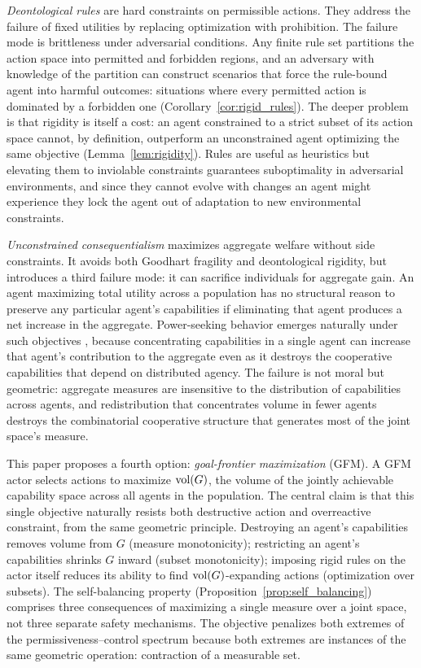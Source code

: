 \emph{Deontological rules} are hard constraints on permissible actions. They
address the failure of fixed utilities by replacing optimization with
prohibition. The failure mode is brittleness under adversarial conditions. Any
finite rule set partitions the action space into permitted and forbidden
regions, and an adversary with knowledge of the partition can construct
scenarios that force the rule-bound agent into harmful outcomes: situations
where every permitted action is dominated by a forbidden one
(Corollary~\ref{cor:rigid_rules}). The deeper problem is that rigidity is
itself a cost: an agent constrained to a strict subset of its action space
cannot, by definition, outperform an unconstrained agent optimizing the same
objective (Lemma~\ref{lem:rigidity}). Rules are useful as heuristics but
elevating them to inviolable constraints guarantees suboptimality in
adversarial environments, and since they cannot evolve with changes an agent
might experience they lock the agent out of adaptation to new environmental
constraints.

\emph{Unconstrained consequentialism} maximizes aggregate welfare without side
constraints. It avoids both Goodhart fragility and deontological rigidity, but
introduces a third failure mode: it can sacrifice individuals for aggregate
gain. An agent maximizing total utility across a population has no structural
reason to preserve any particular agent's capabilities if eliminating that
agent produces a net increase in the aggregate. Power-seeking behavior emerges
naturally under such objectives \citep{carlsmith2022power, turner2021optimal},
because concentrating capabilities in a single agent can increase that agent's
contribution to the aggregate even as it destroys the cooperative capabilities
that depend on distributed agency. The failure is not moral but geometric:
aggregate measures are insensitive to the distribution of capabilities across
agents, and redistribution that concentrates volume in fewer agents destroys
the combinatorial cooperative structure that generates most of the joint
space's measure.

This paper proposes a fourth option: \emph{goal-frontier maximization} (GFM). A
GFM actor selects actions to maximize $\operatorname{vol}(G)$, the volume of the jointly
achievable capability space across all agents in the population. The central
claim is that this single objective naturally resists both destructive action
and overreactive constraint, from the same geometric principle. Destroying an
agent's capabilities removes volume from $G$ (measure monotonicity);
restricting an agent's capabilities shrinks $G$ inward (subset monotonicity);
imposing rigid rules on the actor itself reduces its ability to find
$\operatorname{vol}(G)$-expanding actions (optimization over subsets). The self-balancing
property (Proposition~\ref{prop:self_balancing}) comprises three consequences
of maximizing a single measure over a joint space, not three separate safety
mechanisms. The objective penalizes both extremes of the
permissiveness--control spectrum because both extremes are instances of the
same geometric operation: contraction of a measurable set.


